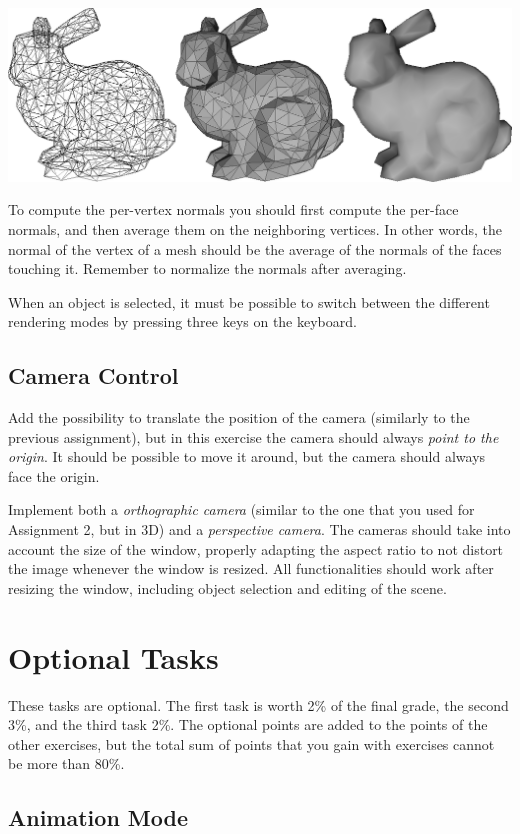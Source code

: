 \documentclass[11pt]{article}
\begin{document}
\includegraphics[width=1\textwidth]{bunny}
    
To compute the per-vertex normals you should first compute the per-face normals, and then average them on the neighboring vertices. In other words, the normal of the vertex of a mesh should be the average of the normals of the faces touching it. Remember to normalize the normals after averaging.

When an object is selected, it must be possible to switch between the different rendering modes by pressing three keys on the keyboard.

\subsection{Camera Control}

Add the possibility to translate the position of the camera (similarly to the previous assignment), but in this exercise the camera should always \emph{point to the origin}. It should be possible to move it around, but the camera should always face the origin.

Implement both a \emph{orthographic camera} (similar to the one that you used for Assignment 2, but in 3D) and a \emph{perspective camera}. The cameras should take into account the size of the window, properly adapting the aspect ratio to not distort the image whenever the window is resized. All functionalities should work after resizing the window, including object selection and editing of the scene.

\section*{Optional Tasks}

These tasks are optional. The first task is worth 2\% of the final grade, the second 3\%, and the third task 2\%. The optional points are added to the points of the other exercises, but the total sum of points that you gain with exercises cannot be more than 80\%.

\subsection{Animation Mode}
\end{document}
